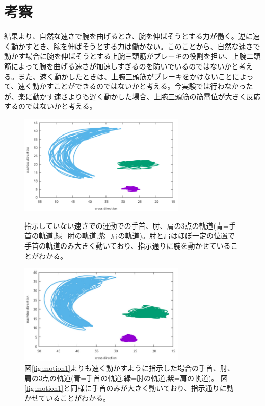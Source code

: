 \documentclass{jsarticle}
\begin{document}
\section{考察}
結果より、自然な速さで腕を曲げるとき、腕を伸ばそうとする力が働く。逆に速く動かすとき、腕を伸ばそうとする力は働かない。このことから、自然な速さで動かす場合に腕を伸ばそうとする上腕三頭筋がブレーキの役割を担い、上腕二頭筋によって腕を曲げる速さが加速しすぎるのを防いでいるのではないかと考える。また、速く動かしたときは、上腕三頭筋がブレーキをかけないことによって、速く動かすことができるのではないかと考える。今実験では行わなかったが、楽に動かす速さよりも遅く動かした場合、上腕三頭筋の筋電位が大きく反応するのではないかと考える。
\begin{figure}[htbp]
  \begin{minipage}{0.5\hsize}
    \begin{center}
      \includegraphics[clip,width=80mm]{Graph_2.png}
      \caption{指示していない速さでの運動での手首、肘、肩の3点の軌道(青=手首の軌道,緑=肘の軌道,紫=肩の軌道)。肘と肩はほぼ一定の位置で手首の軌道のみ大きく動いており、指示通りに腕を動かせていることがわかる。\label{fig:motion1}}
    \end{center}
  \end{minipage}
  \begin{minipage}{0.5\hsize}
    \begin{center}
      \includegraphics[clip,width=80mm]{Graph_3.png}
      \caption{図\ref{fig:motion1}よりも速く動かすように指示した場合の手首、肘、肩の3点の軌道(青=手首の軌道,緑=肘の軌道,紫=肩の軌道)。 図\ref{fig:motion1}と同様に手首のみが大きく動いており、指示通りに動かせていることがわかる。\label{fig:motion2}}
    \end{center}
  \end{minipage}
\end{figure}
\end{document}
